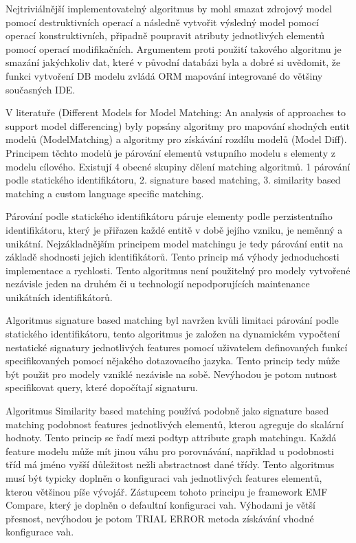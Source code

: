 \documentclass[11pt,twoside,a4paper]{book}
\begin{document}
Nejtriviálnější implementovatelný algoritmus by mohl smazat zdrojový model
pomocí destruktivních operací a následně vytvořit výsledný model pomocí operací
konstruktivních, připadně poupravit atributy jednotlivých elementů pomocí
operací modifikačních. Argumentem proti použití takového algoritmu je smazání jakýchkoliv dat, které v
původní databázi byla a dobré si uvědomit, že funkci vytvoření DB modelu zvládá
ORM mapování integrované do většiny současných IDE.

 V literatuře (Different Models for Model Matching:
An analysis of approaches to support model differencing) byly popsány algoritmy
pro mapování shodných entit modelů (ModelMatching) a algoritmy pro získávání rozdílu modelů (Model Diff).
 Principem těchto modelů je párování elementů vstupního modelu s elementy z
 modelu cílového. Existují 4 obecné skupiny dělení matching algoritmů. 1
 párování podle statického identifikátoru, 2. signature based matching, 3.
 similarity based matching a custom language specific matching.
 
 Párování podle statického identifikátoru páruje elementy podle perzistentního
 identifikátoru, který je přiřazen každé entitě v době jejího vzniku, je
 neměnný a unikátní. Nejzákladnějším principem model matchingu je tedy párování
 entit na základě shodnosti jejich identifikátorů. Tento princip má výhody
 jednoduchosti implementace a rychlosti. Tento algoritmus není použitelný pro
 modely vytvořené nezávisle jeden na druhém či u technologií nepodporujících
 maintenance unikátních identifikátorů.
 
 Algoritmus signature based matching byl navržen kvůli limitaci párování podle
 statického identifikátoru, tento algoritmus je založen na dynamickém vypočtení
 nestatické signatury jednotlivých features pomocí uživatelem definovaných
 funkcí specifikovaných pomocí nějakého dotazovacího jazyka. Tento princip tedy
 může být použit pro modely vzniklé nezávisle na sobě. Nevýhodou je potom
 nutnost specifikovat query, které dopočítají signaturu.
 
 Algoritmus Similarity based matching používá podobně jako signature based
 matching podobnost features jednotlivých elementů, kterou agreguje do skalární hodnoty.
 Tento princip se řadí mezi podtyp attribute graph matchingu. Každá feature
 modelu může mít jinou váhu pro porovnávání, napřiklad u podobnosti tříd má
 jméno vyšší důležitost nežli abstractnost dané třídy.  Tento algoritmus musí
 být typicky doplněn o konfiguraci vah jednotlivých features elementů, kterou
 většinou píše vývojář. Zástupcem tohoto principu je framework EMF Compare, 
 který je doplněn o defaultní konfiguraci vah. Výhodami je větší přesnost,
 nevýhodou je potom TRIAL ERROR metoda získávání vhodné konfigurace vah.
 
\end{document}
